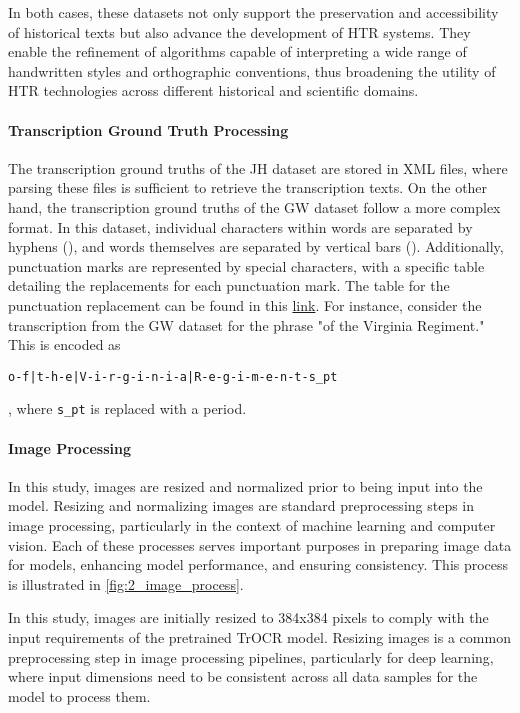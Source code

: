 In both cases, these datasets not only support the preservation and accessibility of historical texts but also advance the development of HTR systems. They enable the refinement of algorithms capable of interpreting a wide range of handwritten styles and orthographic conventions, thus broadening the utility of HTR technologies across different historical and scientific domains.

\paragraph*{Transcription Ground Truth Processing}
\label{par:3_transcription_gound_truth_processing}
The transcription ground truths of the JH dataset are stored in XML files, where parsing these files is sufficient to retrieve the transcription texts. On the other hand, the transcription ground truths of the GW dataset follow a more complex format. In this dataset, individual characters within words are separated by hyphens (\say{ - }), and words themselves are separated by vertical bars (\say{ \textbar \;}). Additionally, punctuation marks are represented by special characters, with a specific table detailing the replacements for each punctuation mark. The table for the punctuation replacement can be found in this \href{https://github.com/Yung-Hsin-Chen/master_thesis/blob/src/model/config/punctuation_list.json}{link}. For instance, consider the transcription from the GW dataset for the phrase "of the Virginia Regiment." This is encoded as 

\begin{center}
    \texttt{o-f|t-h-e|V-i-r-g-i-n-i-a|R-e-g-i-m-e-n-t-s\_pt} 
\end{center}

, where \texttt{s\_pt} is replaced with a period.

\paragraph*{Image Processing}
\label{par:3_image_processing}
In this study, images are resized and normalized prior to being input into the model. Resizing and normalizing images are standard preprocessing steps in image processing, particularly in the context of machine learning and computer vision. Each of these processes serves important purposes in preparing image data for models, enhancing model performance, and ensuring consistency. This process is illustrated in \autoref{fig:2_image_process}.

In this study, images are initially resized to 384x384 pixels to comply with the input requirements of the pretrained TrOCR model. Resizing images is a common preprocessing step in image processing pipelines, particularly for deep learning, where input dimensions need to be consistent across all data samples for the model to process them.

